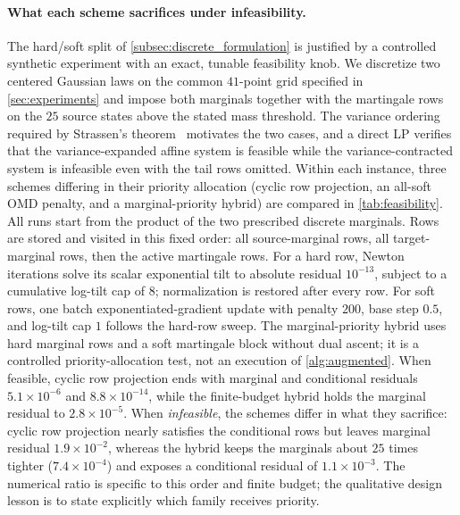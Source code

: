 \documentclass{article}
\begin{document}
\paragraph{What each scheme sacrifices under infeasibility.} The hard/soft split of \cref{subsec:discrete_formulation} is justified by a controlled synthetic experiment with an exact, tunable feasibility knob.
We discretize two centered Gaussian laws on the common $41$-point grid specified in \cref{sec:experiments} and impose both marginals together with the martingale rows on the $25$ source states above the stated mass threshold.
The variance ordering required by Strassen's theorem~\citep{strassen1965existence} motivates the two cases, and a direct LP verifies that the variance-expanded affine system is feasible while the variance-contracted system is infeasible even with the tail rows omitted.
Within each instance, three schemes differing in their priority allocation (cyclic row projection, an all-soft OMD penalty, and a marginal-priority hybrid) are compared in \cref{tab:feasibility}.
All runs start from the product of the two prescribed discrete marginals.
Rows are stored and visited in this fixed order: all source-marginal rows, all target-marginal rows, then the active martingale rows.
For a hard row, Newton iterations solve its scalar exponential tilt to absolute residual $10^{-13}$, subject to a cumulative log-tilt cap of $8$; normalization is restored after every row.
For soft rows, one batch exponentiated-gradient update with penalty $200$, base step $0.5$, and log-tilt cap $1$ follows the hard-row sweep.
The marginal-priority hybrid uses hard marginal rows and a soft martingale block without dual ascent; it is a controlled priority-allocation test, not an execution of \cref{alg:augmented}.
When feasible, cyclic row projection ends with marginal and conditional residuals $5.1\times10^{-6}$ and $8.8\times10^{-14}$, while the finite-budget hybrid holds the marginal residual to $2.8\times10^{-5}$.
When \emph{infeasible}, the schemes differ in what they sacrifice: cyclic row projection nearly satisfies the conditional rows but leaves marginal residual $1.9\times10^{-2}$, whereas the hybrid keeps the marginals about $25$ times tighter ($7.4\times10^{-4}$) and exposes a conditional residual of $1.1\times10^{-3}$.
The numerical ratio is specific to this order and finite budget; the qualitative design lesson is to state explicitly which family receives priority.
\end{document}
